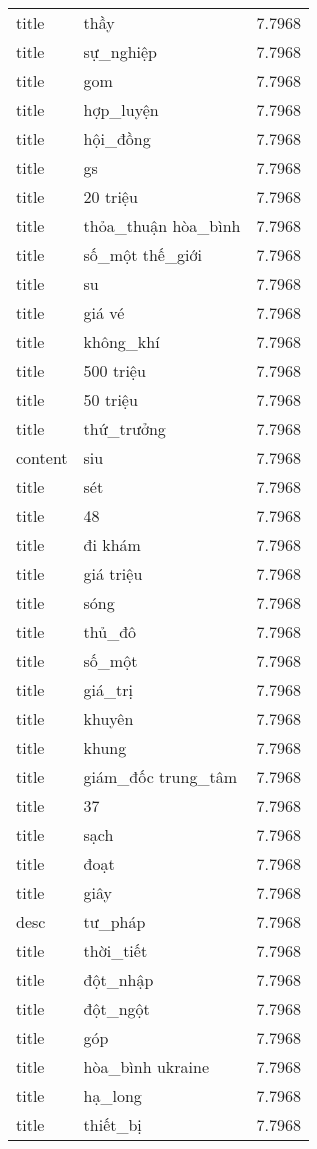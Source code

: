 \documentclass{article}
\begin{document}
\begin{tabular}{lll}
title & thầy & 7.7968\\
title & sự\_nghiệp & 7.7968\\
title & gom & 7.7968\\
title & hợp\_luyện & 7.7968\\
title & hội\_đồng & 7.7968\\
title & gs & 7.7968\\
title & 20 triệu & 7.7968\\
title & thỏa\_thuận hòa\_bình & 7.7968\\
title & số\_một thế\_giới & 7.7968\\
title & su & 7.7968\\
title & giá vé & 7.7968\\
title & không\_khí & 7.7968\\
title & 500 triệu & 7.7968\\
title & 50 triệu & 7.7968\\
title & thứ\_trưởng & 7.7968\\
content & siu & 7.7968\\
title & sét & 7.7968\\
title & 48 & 7.7968\\
title & đi khám & 7.7968\\
title & giá triệu & 7.7968\\
title & sóng & 7.7968\\
title & thủ\_đô & 7.7968\\
title & số\_một & 7.7968\\
title & giá\_trị & 7.7968\\
title & khuyên & 7.7968\\
title & khung & 7.7968\\
title & giám\_đốc trung\_tâm & 7.7968\\
title & 37 & 7.7968\\
title & sạch & 7.7968\\
title & đoạt & 7.7968\\
title & giây & 7.7968\\
desc & tư\_pháp & 7.7968\\
title & thời\_tiết & 7.7968\\
title & đột\_nhập & 7.7968\\
title & đột\_ngột & 7.7968\\
title & góp & 7.7968\\
title & hòa\_bình ukraine & 7.7968\\
title & hạ\_long & 7.7968\\
title & thiết\_bị & 7.7968\\

\end{tabular}
\end{document}
